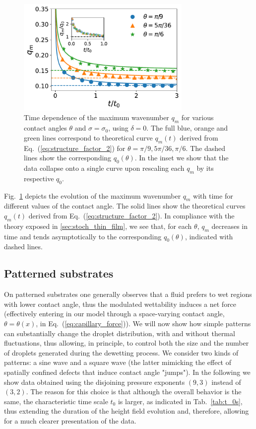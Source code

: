 \begin{figure}
    \centering
    \includegraphics[width=0.75\textwidth]{graphics/evolution_qm_with_inset_slip0.pdf}
    \caption{Time dependence of the maximum wavenumber $q_m$ for various contact angles $\theta$ and $\sigma = \sigma_0$, using $\delta=0$.
    The full blue, orange and green lines correspond to theoretical curve $q_m(t)$ derived from Eq.~(\ref{eq:structure_factor_2}) for $\theta = \pi/9, 5\pi/36, \pi/6$.
    The dashed lines show the corresponding $q_0(\theta)$. 
    In the inset we show that the data collapse onto a single curve upon rescaling each $q_m$ by its respective $q_0$.}
    \label{fig:evolution_spectrum_peak_with_t}
\end{figure}
Fig.~\ref{fig:evolution_spectrum_peak_with_t} depicts the evolution of the maximum wavenumber $q_m$ with time for different values of the contact angle.
The solid lines show the theoretical curves $q_m(t)$ derived from Eq.~(\ref{eq:structure_factor_2}).
In compliance with the theory exposed in \ref{sec:stoch_thin_film}, we see that, for each $\theta$, $q_m$ decreases in time and tends asymptotically to the corresponding $q_0(\theta)$, indicated with dashed lines.

\subsection{Patterned substrates}\label{subsec:patterned_substrates}
On patterned substrates one generally observes that a fluid prefers to wet regions with lower contact angle, thus the modulated wettability induces a net force (effectively entering in our model through a space-varying contact angle, $\theta=\theta(x)$, in Eq.~(\ref{eq:capillary_force})).
We will now show how simple patterns can substantially change the droplet distribution, with and without thermal fluctuations, thus allowing, in principle, to control both the size and the number of droplets generated during the dewetting process.
We consider two kinds of patterns: a sine wave and a square wave (the latter mimicking the effect of spatially confined defects that induce contact angle "jumps").
In the following we show data obtained using the disjoining pressure exponents $(9,3)$ instead of $(3,2)$.
The reason for this choice is that although the overall behavior is the same, the characteristic time scale $t_0$ is larger, as indicated in Tab.~\ref{tab:t_0s}, thus extending the duration of the height field evolution and, therefore, allowing for a much clearer presentation of the data.

